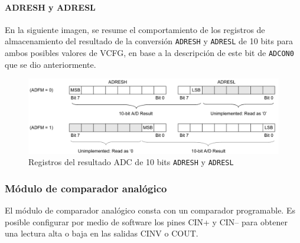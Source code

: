 \paragraph{ADRESH y ADRESL}

En la siguiente imagen, se resume el comportamiento de los registros de almacenamiento del resultado de la conversión \texttt{ADRESH} y \texttt{ADRESL} de 10 bits para ambos posibles valores de VCFG, en base a la descripción de este bit de \texttt{ADCON0} que se dio anteriormente.

\begin{figure}[!h]
    \centering
    \includegraphics[width = 0.8\linewidth]{imagenes/fig5.png}
    \caption{Registros del resultado ADC de 10 bits \texttt{ADRESH} y \texttt{ADRESL}}
    \label{fig5}
\end{figure}

\newpage

\subsubsection{Módulo de comparador analógico}

El módulo de comparador analógico consta con un comparador programable. 
Es posible configurar por medio de software los pines CIN+ y CIN-- para obtener una lectura alta o baja en las salidas CINV o COUT.

